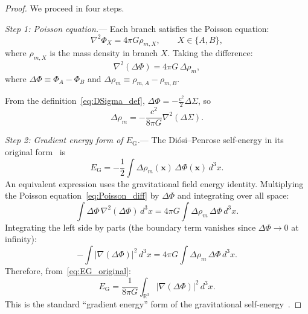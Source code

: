 \documentclass[letterpaper,twocolumn,superscriptaddress,longbibliography]{revtex4-2}
\newcommand{\EG}{E_{\mathrm{G}}}
\newcommand{\DSigma}{\Delta\Sigma}
\newcommand{\DPhi}{\Delta\Phi}
\begin{document}
\begin{proof}
We proceed in four steps.

\emph{Step 1: Poisson equation.}---
Each branch satisfies the Poisson equation:
\begin{equation}
  \nabla^2 \Phi_X = 4\pi G \rho_{m,X}, \qquad X \in \{A, B\},
  \label{eq:Poisson}
\end{equation}
where $\rho_{m,X}$ is the mass density in branch $X$.
Taking the difference:
\begin{equation}
  \nabla^2(\DPhi) = 4\pi G \, \Delta\rho_m,
  \label{eq:Poisson_diff}
\end{equation}
where $\DPhi \equiv \Phi_A - \Phi_B$ and
$\Delta\rho_m \equiv \rho_{m,A} - \rho_{m,B}$.

From the definition~\eqref{eq:DSigma_def},
$\DPhi = -\frac{c^2}{2}\DSigma$, so
\begin{equation}
  \Delta\rho_m = -\frac{c^2}{8\pi G}\nabla^2(\DSigma).
  \label{eq:rho_from_Sigma}
\end{equation}

\emph{Step 2: Gradient energy form of $\EG$.}---
The Di\'{o}si--Penrose self-energy in its original
form~\cite{Penrose1996} is
\begin{equation}
  \EG = -\frac{1}{2}\int \Delta\rho_m(\bm{x}) \, \DPhi(\bm{x})
  \, d^3x.
  \label{eq:EG_original}
\end{equation}
An equivalent expression uses the gravitational field energy
identity.
Multiplying the Poisson equation~\eqref{eq:Poisson_diff}
by $\DPhi$ and integrating over all space:
\begin{equation}
  \int \DPhi \, \nabla^2(\DPhi) \, d^3x
  = 4\pi G \int \Delta\rho_m \, \DPhi \, d^3x.
  \label{eq:Poisson_integrated}
\end{equation}
Integrating the left side by parts (the boundary term vanishes
since $\DPhi \to 0$ at infinity):
\begin{equation}
  -\int |\nabla(\DPhi)|^2 \, d^3x
  = 4\pi G \int \Delta\rho_m \, \DPhi \, d^3x.
  \label{eq:ibp}
\end{equation}
Therefore, from~\eqref{eq:EG_original}:
\begin{equation}
  \EG = \frac{1}{8\pi G}
        \int_{\mathbb{R}^3} |\nabla(\DPhi)|^2 \, d^3x.
  \label{eq:EG_gradient}
\end{equation}
This is the standard ``gradient energy'' form of the
gravitational self-energy~\cite{Giulini2011}.


\end{proof}
\end{document}
